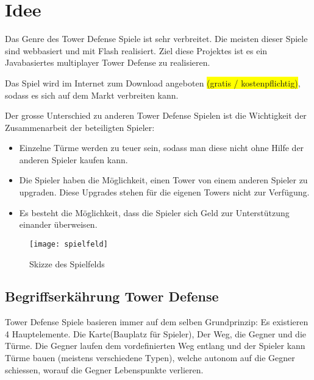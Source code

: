 \section{Idee}
Das Genre des Tower Defense Spiele ist sehr verbreitet. Die meisten dieser Spiele sind webbasiert und mit Flash realisiert. Ziel diese Projektes ist es ein Javabasiertes multiplayer Tower Defense zu realisieren.

Das Spiel wird im Internet zum Download angeboten \colorbox{yellow}{(gratis / kostenpflichtig)}, sodass es sich auf dem Markt verbreiten kann.

Der grosse Unterschied zu anderen Tower Defense Spielen ist die Wichtigkeit der Zusammenarbeit der beteiligten Spieler:
\begin{itemize}
 \item Einzelne Türme werden zu teuer sein, sodass man diese nicht ohne Hilfe der anderen Spieler kaufen kann.
 \item Die Spieler haben die Möglichkeit, einen Tower von einem anderen Spieler zu upgraden. Diese Upgrades stehen für die eigenen Towers nicht zur Verfügung.
 \item Es besteht die Möglichkeit, dass die Spieler sich Geld zur Unterstützung einander überweisen.
\end{itemize}

\begin{figure}[htb]
 \begin{center}
  \texttt{[image: spielfeld]}
 \end{center}
 \caption{Skizze des Spielfelds}
 \label{fig:spielfeld_skizze}
\end{figure}

\subsection{Begriffserkährung Tower Defense}
Tower Defense Spiele basieren immer auf dem selben Grundprinzip:
Es existieren 4 Hauptelemente. Die Karte(Bauplatz für Spieler), Der Weg, die Gegner und die Türme.
Die Gegner laufen dem vordefinierten Weg entlang und der Spieler kann Türme bauen (meistens verschiedene Typen), welche autonom auf die Gegner schiessen, worauf die Gegner Lebenspunkte verlieren.
